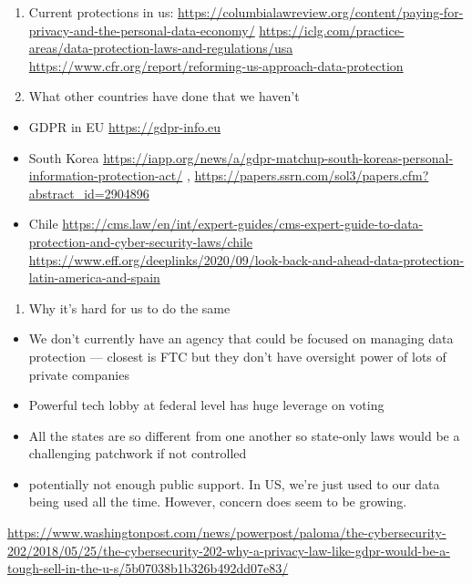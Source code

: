 \documentclass[water,article,submit,moreauthors,pdftex]{mdpi}
\providecommand{\tightlist}{%
  \setlength{\itemsep}{0pt}\setlength{\parskip}{4pt}}
\begin{document}
\begin{enumerate}
\def\labelenumi{\arabic{enumi}.}
\setcounter{enumi}{3}
\item
  Current protections in us:
  \url{https://columbialawreview.org/content/paying-for-privacy-and-the-personal-data-economy/}
  \url{https://iclg.com/practice-areas/data-protection-laws-and-regulations/usa}
  \url{https://www.cfr.org/report/reforming-us-approach-data-protection}
\item
  What other countries have done that we haven't
\end{enumerate}

\begin{itemize}
\tightlist
\item
  GDPR in EU \url{https://gdpr-info.eu}
\item
  South Korea
  \url{https://iapp.org/news/a/gdpr-matchup-south-koreas-personal-information-protection-act/}
  , \url{https://papers.ssrn.com/sol3/papers.cfm?abstract_id=2904896}
\item
  Chile
  \url{https://cms.law/en/int/expert-guides/cms-expert-guide-to-data-protection-and-cyber-security-laws/chile}
  \url{https://www.eff.org/deeplinks/2020/09/look-back-and-ahead-data-protection-latin-america-and-spain}
\end{itemize}

\begin{enumerate}
\def\labelenumi{\arabic{enumi}.}
\setcounter{enumi}{4}
\tightlist
\item
  Why it's hard for us to do the same
\end{enumerate}

\begin{itemize}
\tightlist
\item
  We don't currently have an agency that could be focused on managing
  data protection --- closest is FTC but they don't have oversight power
  of lots of private companies
\item
  Powerful tech lobby at federal level has huge leverage on voting
\item
  All the states are so different from one another so state-only laws
  would be a challenging patchwork if not controlled
\item
  potentially not enough public support. In US, we're just used to our
  data being used all the time. However, concern does seem to be
  growing.
\end{itemize}

\url{https://www.washingtonpost.com/news/powerpost/paloma/the-cybersecurity-202/2018/05/25/the-cybersecurity-202-why-a-privacy-law-like-gdpr-would-be-a-tough-sell-in-the-u-s/5b07038b1b326b492dd07e83/}
\end{document}
